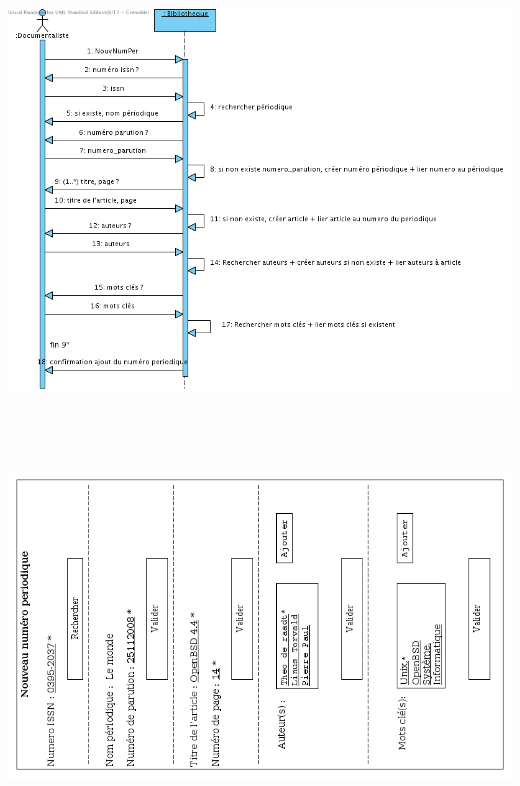 \documentclass[a4paper,10pt]{report}
\begin{document}
\includegraphics[height=115mm]{NouvNumPerHautNiveau.png}

\newpage

\includegraphics[height=100mm]{UpNouvNumPer.png}
\end{document}
